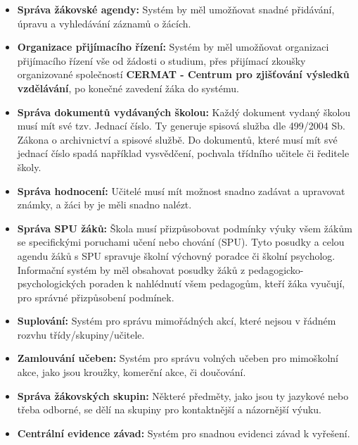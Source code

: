 \documentclass[FM,Proj]{tulthesis}
\begin{document}
\begin{itemize}
    \item \textbf{Správa žákovské agendy:} Systém by měl umožňovat snadné přidávání, úpravu a vyhledávání záznamů o žácích.
    
    \item \textbf{Organizace přijímacího řízení:} Systém by měl umožňovat organizaci přijímacího řízení vše od 
    žádosti o studium, přes přijímací zkoušky organizované společností \textbf{CERMAT - Centrum pro zjišťování 
    výsledků vzdělávání}, po konečné zavedení žáka do systému.
    
    \item \textbf{Správa dokumentů vydávaných školou:} Každý dokument vydaný školou musí mít své tzv. Jednací číslo.
    Ty generuje spisová služba dle 499/2004 Sb. Zákona o archivnictví a spisové službě. Do dokumentů, které musí mít
    své jednací číslo spadá například vysvědčení, pochvala třídního učitele či ředitele školy.

    \item \textbf{Správa hodnocení:} Učitelé musí mít možnost snadno zadávat a upravovat známky, 
    a žáci by je měli snadno nalézt.

    \item \textbf{Správa SPU žáků:} Škola musí přizpůsobovat podmínky výuky všem žákům se specifickými poruchami učení
    nebo chování (SPU). Tyto posudky a celou agendu žáků s SPU spravuje školní výchovný poradce či školní psycholog.
    Informační systém by měl obsahovat posudky žáků z pedagogicko-psychologických poraden k nahlédnutí všem pedagogům, 
    kteří žáka vyučují, pro správné přizpůsobení podmínek.

    \item \textbf{Suplování:} Systém pro správu mimořádných akcí, které nejsou v řádném rozvhu třídy/skupiny/učitele.
    
    \item \textbf{Zamlouvání učeben:} Systém pro správu volných učeben pro mimoškolní akce, jako jsou kroužky, komerční
    akce, či doučování.
    
    \item \textbf{Správa žákovských skupin:} Některé předměty, jako jsou ty jazykové nebo třeba odborné, se dělí na skupiny pro 
    kontaktnější a názornější výuku.
    
    \item \textbf{Centrální evidence závad:} Systém pro snadnou evidenci závad k vyřešení.


\end{itemize}
\end{document}
